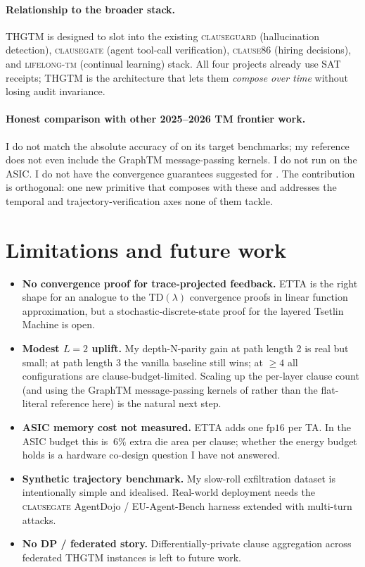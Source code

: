 \documentclass[11pt]{article}
\begin{document}
\paragraph{Relationship to the broader stack.}  THGTM is designed to slot into the existing \textsc{clauseguard} (hallucination detection), \textsc{clausegate} (agent tool-call verification), \textsc{clause86} (hiring decisions), and \textsc{lifelong-tm} (continual learning) stack.  All four projects already use SAT receipts; THGTM is the architecture that lets them \emph{compose over time} without losing audit invariance.

\paragraph{Honest comparison with other 2025--2026 TM frontier work.}  I do not match the absolute accuracy of \cite{granmo2025graphtm} on its target benchmarks; my reference does not even include the GraphTM message-passing kernels.  I do not run on the \cite{tunheim2025convcotm} ASIC.  I do not have the convergence guarantees suggested for \cite{hnilov2025fuzzytm}.  The contribution is orthogonal: one new primitive that composes with these and addresses the temporal and trajectory-verification axes none of them tackle.

\section{Limitations and future work}
\label{sec:limits}
\begin{itemize}
\item \textbf{No convergence proof for trace-projected feedback.}  ETTA is the right shape for an analogue to the TD$(\lambda)$ convergence proofs in linear function approximation, but a stochastic-discrete-state proof for the layered Tsetlin Machine is open.
\item \textbf{Modest $L\!=\!2$ uplift.}  My depth-N-parity gain at path length 2 is real but small; at path length 3 the vanilla baseline still wins; at $\geq 4$ all configurations are clause-budget-limited.  Scaling up the per-layer clause count (and using the GraphTM message-passing kernels of \citealp{granmo2025graphtm} rather than the flat-literal reference here) is the natural next step.
\item \textbf{ASIC memory cost not measured.}  ETTA adds one $\mathrm{fp16}$ per TA.  In the \cite{tunheim2025convcotm} ASIC budget this is $~6\%$ extra die area per clause; whether the energy budget holds is a hardware co-design question I have not answered.
\item \textbf{Synthetic trajectory benchmark.}  My slow-roll exfiltration dataset is intentionally simple and idealised.  Real-world deployment needs the \textsc{clausegate} AgentDojo / EU-Agent-Bench harness extended with multi-turn attacks.
\item \textbf{No DP / federated story.}  Differentially-private clause aggregation across federated THGTM instances is left to future work.
\end{itemize}
\end{document}
